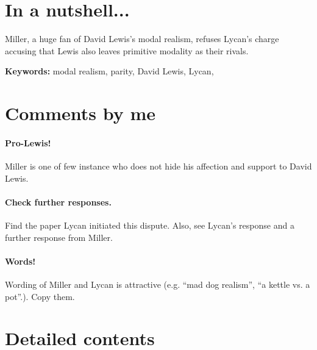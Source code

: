 \documentclass[
10pt, %
a4paper, %
twocolumn, %
landscape %
]{article}
\begin{document}
\pagestyle{myheadings} %
\markright{\doctitle} %


\thispagestyle{plain} %

\printtitle %


\section*{In a nutshell... }
Miller, a huge fan of David Lewis's modal realism, refuses Lycan's charge accusing that Lewis also leaves primitive modality as their rivals.

\noindent \textbf{Keywords:} modal realism, parity, David Lewis, Lycan,

\section*{Comments by me}
\paragraph{Pro-Lewis!}
Miller is one of few instance who does not hide his affection and support to David Lewis.
\paragraph{Check further responses.}
Find the paper Lycan initiated this dispute.
Also, see Lycan's response and a further response from Miller.
\paragraph{Words!}
Wording of Miller and Lycan is attractive (e.g. ``mad dog realism'', ``a kettle vs. a pot''.).
Copy them.

\section*{Detailed contents}
\end{document}
